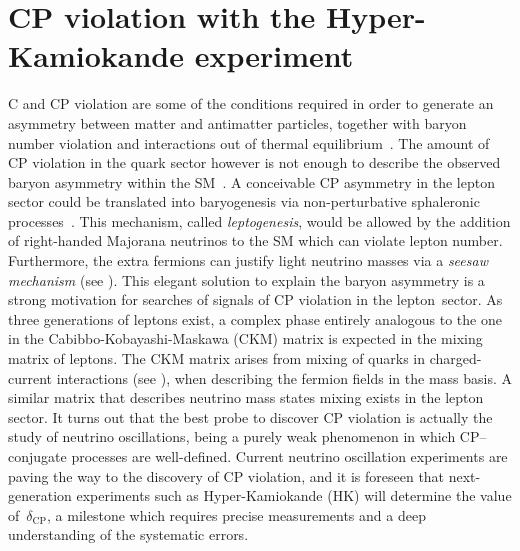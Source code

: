 
\clearpage
\chapter[CP violation with HK]{CP violation with the Hyper-Kamiokande experiment}
\label{cha:cp_hk}


C and CP violation are some of the conditions required in order to generate %
an asymmetry between matter and antimatter particles, together with %
baryon number violation and interactions out of thermal equilibrium~\cite{Sakharov:1967dj}.
The amount of CP violation in the quark sector however is not enough %
to describe the observed baryon asymmetry within the SM~\cite{Farrar:1993hn}.
A conceivable CP asymmetry in the lepton sector could be translated into baryogenesis %
via non-perturbative sphaleronic processes~\cite{Fukugita:1986hr}.
This mechanism, called \emph{leptogenesis}, would be allowed by the addition of %
right-handed Majorana neutrinos to the SM which can violate lepton number.
Furthermore, the extra fermions can justify light neutrino masses via a \emph{seesaw mechanism} (see ).
This elegant solution to explain the baryon asymmetry is a strong motivation %
for searches of signals of CP violation in the lepton~sector.
As three generations of leptons exist, a complex phase entirely analogous to the one %
in the Cabibbo-Kobayashi-Maskawa (CKM) matrix is expected in the mixing matrix of leptons.
The CKM matrix arises from mixing of quarks in charged-current interactions (see ), %
when describing the fermion fields in the mass basis.
A similar matrix that describes neutrino mass states mixing exists in the lepton sector.
It turns out that the best probe to discover CP violation is actually the study of neutrino oscillations, %
being a purely weak phenomenon in which CP--conjugate processes are well-defined.
Current neutrino oscillation experiments are paving the way to the discovery of CP violation, %
and it is foreseen that next-generation experiments such as Hyper-Kamiokande (HK) %
will determine the value of~$\delta_\text{CP}$, a milestone which requires precise measurements %
and a deep understanding of the systematic errors.

